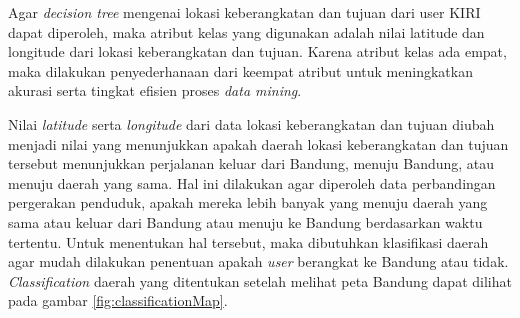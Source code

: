 \begin{center}
\begin{table}
\rotatebox{90}{%
\begin{tabular}{|l|l|l|l|p{3.5cm}|p{3.5cm}|p{3.5cm}|p{3.5cm}|}
\hline
\textbf{Bulan}	& \textbf{Tahun} 	& \textbf{Hari} & \textbf{Jam} & \textbf{Latitude Keberangkatan} & \textbf{Longitude Keberangkatan} & \textbf{Latitude Tujuan} & \textbf{Longitude Tujuan}      \\ \hline
02								& 2014						& Sabtu         & 07						 & -6.8972513										 & 107.6185574 							  & -6.91358                & 107.62718 \\ \hline
02								& 2014						& Sabtu         & 07						 & -6.8972513										 & 107.6385574                & -6.91358							  & 107.62718 \\ \hline
02								& 2014						& Sabtu         & 07 						 & -6.90598											 & 107.59714     		  				& -6.90855						&107.61082 \\ \hline
02								& 2014						& Sabtu        & 07  					 & -6.9015366										 & 107.5414474 								& -6.88574					    & 107.53816 \\ \hline
02								& 2014						& Sabtu         & 07 						 & -6.90608										   & 107.61530     						  & -6.89140					 &107.61060 \\ \hline
02								& 2014						& Sabtu         & 07 						 & -6.89459											 & 107.58818     							& -6.89876						&107.60886 \\ \hline
02								& 2014						& Sabtu         & 07 						 & -6.89459											 &107.58818  								   & -6.86031					 &107.61287 \\ \hline
\end{tabular}%
}
\caption{Contoh hasil data transformasi}
\label{table:contohHasilDataTransformasi}
\end{table}
\end{center}
Agar \textsl{decision tree} mengenai lokasi keberangkatan dan tujuan dari user KIRI dapat diperoleh, maka atribut kelas yang digunakan adalah nilai latitude dan longitude dari lokasi keberangkatan dan tujuan. Karena atribut kelas ada empat, maka dilakukan penyederhanaan dari keempat atribut untuk meningkatkan akurasi serta tingkat efisien proses \textsl{data mining}. 

Nilai \textsl{latitude} serta \textsl{longitude} dari data lokasi keberangkatan dan tujuan diubah menjadi nilai yang menunjukkan apakah daerah lokasi keberangkatan dan tujuan tersebut menunjukkan perjalanan keluar dari Bandung, menuju Bandung, atau menuju daerah yang sama. Hal ini dilakukan agar diperoleh data perbandingan pergerakan penduduk, apakah mereka lebih banyak yang menuju daerah yang sama atau keluar dari Bandung atau menuju ke Bandung berdasarkan waktu tertentu. Untuk menentukan hal tersebut, maka dibutuhkan klasifikasi daerah agar mudah dilakukan penentuan apakah \textsl{user} berangkat ke Bandung atau tidak. \textsl{Classification} daerah yang ditentukan setelah melihat peta Bandung dapat dilihat pada gambar \ref{fig:classificationMap}.

